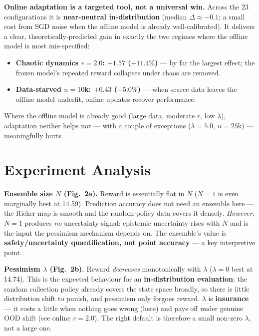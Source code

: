 \documentclass[11pt]{article}
\begin{document}
\textbf{Online adaptation is a targeted tool, not a universal win.} Across
the 23 configurations it is \textbf{near-neutral in-distribution} (median
$\Delta \approx -0.1$; a small cost from SGD noise when the offline model is
already well-calibrated). It delivers a clear, theoretically-predicted gain
in exactly the two regimes where the offline model is most mis-specified:
\begin{itemize}
  \item \textbf{Chaotic dynamics $r=2.0$: $+1.57$ ($+11.4\%$)} --- by far
        the largest effect; the frozen model's repeated reward collapses
        under chaos are removed.
  \item \textbf{Data-starved $n=10$k: $+0.43$ ($+5.0\%$)} --- when scarce
        data leaves the offline model underfit, online updates recover
        performance.
\end{itemize}
Where the offline model is already good (large data, moderate $r$, low
$\lambda$), adaptation neither helps nor --- with a couple of exceptions
($\lambda=5.0$, $n=25$k) --- meaningfully hurts.

\section{Experiment Analysis}

\textbf{Ensemble size $N$ (Fig.~2a).} Reward is essentially flat in $N$
($N{=}1$ is even marginally best at 14.59). Prediction accuracy does not
need an ensemble here --- the Ricker map is smooth and the random-policy
data covers it densely. \emph{However}, $N{=}1$ produces \emph{no}
uncertainty signal: epistemic uncertainty rises with $N$ and is the input
the pessimism mechanism depends on. The ensemble's value is
\textbf{safety/uncertainty quantification, not point accuracy} --- a key
interpretive point.

\textbf{Pessimism $\lambda$ (Fig.~2b).} Reward \emph{decreases}
monotonically with $\lambda$ ($\lambda{=}0$ best at 14.74). This is the
expected behaviour for an \textbf{in-distribution evaluation}: the random
collection policy already covers the state space broadly, so there is little
distribution shift to punish, and pessimism only forgoes reward. $\lambda$
is \textbf{insurance} --- it costs a little when nothing goes wrong (here)
and pays off under genuine OOD shift (see online $r=2.0$). The right default
is therefore a small non-zero $\lambda$, not a large one.
\end{document}
